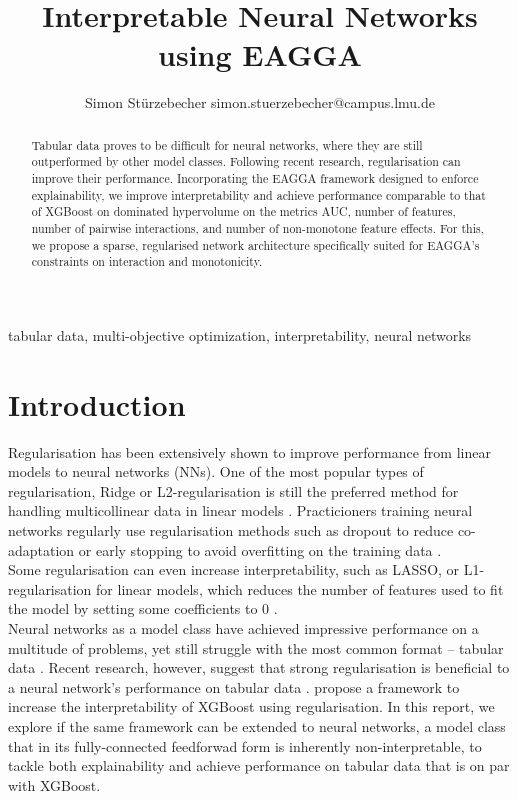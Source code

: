 \documentclass[twoside,11pt]{article}
\begin{document}
\title{Interpretable Neural Networks using EAGGA}

\author{\name Simon Stürzebecher \email simon.stuerzebecher@campus.lmu.de}


\maketitle

\begin{abstract}%
  Tabular data proves to be difficult for neural networks, where they are still outperformed by other model classes.
  Following recent research, regularisation can improve their performance. Incorporating the EAGGA framework designed to
  enforce explainability, we improve interpretability and achieve performance comparable to that of XGBoost on
  dominated hypervolume on the metrics AUC, number of features, number of pairwise interactions, and number of non-monotone feature effects.
  For this, we propose a sparse, regularised network architecture specifically suited for EAGGA's constraints on
  interaction and monotonicity.
\end{abstract}

\begin{keywords}
  tabular data, multi-objective optimization, interpretability, neural networks
\end{keywords}


\section{Introduction}
Regularisation has been extensively shown to improve performance from linear models to neural networks (NNs).
One of the most popular types of regularisation, Ridge or L2-regularisation is still the preferred method for handling
multicollinear data in linear models \citep[p. 55]{ridge}.
Practicioners training neural networks regularly use regularisation methods such as dropout to reduce
co-adaptation \citep[p. 1]{hinton2012improvingneuralnetworkspreventing} or early stopping to avoid overfitting on the training data \citep[p. 778f]{early_stopping}.
\\
Some regularisation can even increase interpretability, such as LASSO, or L1-regularisation for linear models, which reduces the number of
features used to fit the model by setting some coefficients to 0 \citep[p. 267]{lasso}.
\\
Neural networks as a model class have achieved impressive performance on a multitude of problems, yet still struggle with the most common format --
tabular data \citep[p. 7499]{Borisov_2024}.
Recent research, however, suggest that strong regularisation is beneficial to a neural network's performance on tabular data \citep[p. 8]{NEURIPS2021_c902b497}.
\citet{EAGGA} propose a framework to increase the interpretability of XGBoost using regularisation.
In this report, we explore if the same framework can be extended to neural networks, a model class that in its fully-connected feedforwad form is
inherently non-interpretable, to tackle both explainability and achieve performance on tabular data that is on par with XGBoost.
\end{document}
